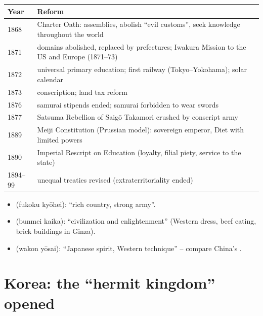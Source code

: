 \begin{center}
\begin{tabular}{lp{10.5cm}}
\toprule
Year & Reform \\
\midrule
1868 & Charter Oath: assemblies, abolish ``evil customs'', seek knowledge throughout the world \\
1871 & domains abolished, replaced by prefectures; Iwakura Mission to the US and Europe (1871--73) \\
1872 & universal primary education; first railway (Tokyo--Yokohama); solar calendar \\
1873 & conscription; land tax reform \\
1876 & samurai stipends ended; samurai forbidden to wear swords \\
1877 & Satsuma Rebellion of Saigō Takamori crushed by conscript army \\
1889 & Meiji Constitution (Prussian model): sovereign emperor, Diet with limited powers \\
1890 & Imperial Rescript on Education (loyalty, filial piety, service to the state) \\
1894--99 & unequal treaties revised (extraterritoriality ended) \\
\bottomrule
\end{tabular}
\end{center}

\begin{important}
\begin{itemize}
  \item {} (fukoku kyōhei): ``rich country, strong army''.
  \item {} (bunmei kaika): ``civilization and enlightenment'' (Western dress,
        beef eating, brick buildings in Ginza).
  \item {} (wakon yōsai): ``Japanese spirit, Western technique'' -- compare
        China's .
\end{itemize}
\end{important}

\section{Korea: the ``hermit kingdom'' opened}

